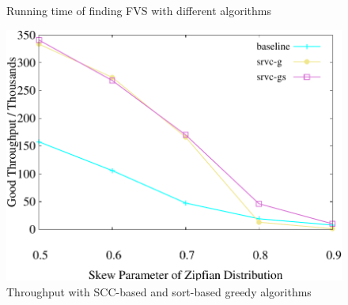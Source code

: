 \begin{figure}[t]
\begin{minipage}[b]{0.32\linewidth}
        \vspace{-2em}
        \caption{Running time of finding FVS with different algorithms}
        \label{fig:fvs:latency}
    \end{minipage}
    \begin{minipage}[b]{0.32\linewidth}
        \centering
        \includegraphics[width=\textwidth]{./exp_fig/fvs/tps}
        \vspace{-2em}
        \caption{Throughput with SCC-based and sort-based greedy algorithms}
        \label{fig:fvs:tps}
    \end{minipage}
\end{figure}

